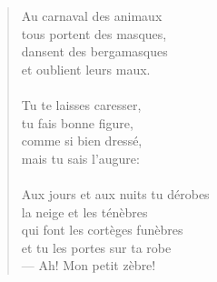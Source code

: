 \documentclass[twocolumn,11pt,a4paper]{article}
\begin{document}
\begin{verse}
\newpage

Au carnaval des animaux\\
tous portent des masques,\\
dansent des bergamasques\\
et oublient leurs maux.\\
\ \\

Tu te laisses caresser,\\
tu fais bonne figure,\\
comme si bien dressé,\\
mais tu sais l'augure:\\
\ \\

Aux jours et aux nuits tu dérobes\\
la neige et les ténèbres\\
qui font les cortèges funèbres\\
et tu les portes sur ta robe\\
--- Ah! Mon petit zèbre!
\end{verse}
\end{document}
